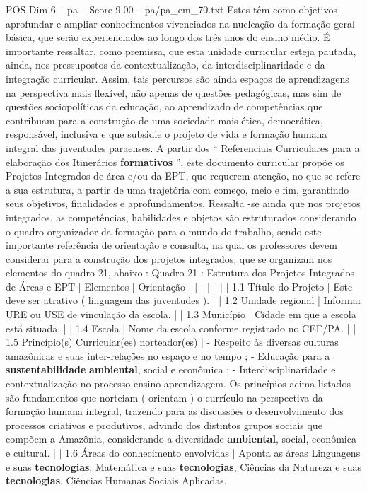 \begin{textsample}{POS Dim 6 – pa – Score 9.00 – pa/pa\_em\_70.txt}
Estes têm como objetivos aprofundar e ampliar conhecimentos vivenciados na nucleação da formação geral básica, que serão experienciados ao longo dos três anos do ensino médio.
É importante ressaltar, como premissa, que esta unidade curricular esteja pautada, ainda, nos pressupostos da contextualização, da interdisciplinaridade e da integração curricular.
Assim, tais percursos são ainda espaços de aprendizagens na perspectiva mais flexível, não apenas de questões pedagógicas, mas sim de questões sociopolíticas da educação, ao aprendizado de competências que contribuam para a construção de uma sociedade mais ética, democrática, responsável, inclusiva e que subsidie o projeto de vida e formação humana integral das juventudes paraenses.
A partir dos “ Referenciais Curriculares para a elaboração dos Itinerários \textbf{formativos} ”, este documento curricular propõe os Projetos Integrados de área e/ou da EPT, que requerem atenção, no que se refere a sua estrutura, a partir de uma trajetória com começo, meio e fim, garantindo seus objetivos, finalidades e aprofundamentos.
Ressalta -se ainda que nos projetos integrados, as competências, habilidades e objetos são estruturados considerando o quadro organizador da formação para o mundo do trabalho, sendo este importante referência de orientação e consulta, na qual os professores devem considerar para a construção dos projetos integrados, que se organizam nos elementos do quadro 21, abaixo : Quadro 21 : Estrutura dos Projetos Integrados de Áreas e EPT | Elementos | Orientação | |---|---| | 1.1 Título do Projeto | Este deve ser atrativo ( linguagem das juventudes ). | | 1.2 Unidade regional | Informar URE ou USE de vinculação da escola. | | 1.3 Município | Cidade em que a escola está situada. | | 1.4 Escola | Nome da escola conforme registrado no CEE/PA. | | 1.5 Princípio(s) Curricular(es) norteador(es) | - Respeito às diversas culturas amazônicas e suas inter-relações no espaço e no tempo ; - Educação para a \textbf{sustentabilidade} \textbf{ambiental}, social e econômica ; - Interdisciplinaridade e contextualização no processo ensino-aprendizagem.
Os princípios acima listados são fundamentos que norteiam ( orientam ) o currículo na perspectiva da formação humana integral, trazendo para as discussões o desenvolvimento dos processos criativos e produtivos, advindo dos distintos grupos sociais que compõem a Amazônia, considerando a diversidade \textbf{ambiental}, social, econômica e cultural. | | 1.6 Áreas do conhecimento envolvidas | Aponta as áreas Linguagens e suas \textbf{tecnologias}, Matemática e suas \textbf{tecnologias}, Ciências da Natureza e suas \textbf{tecnologias}, Ciências Humanas Sociais Aplicadas.

\end{textsample}
